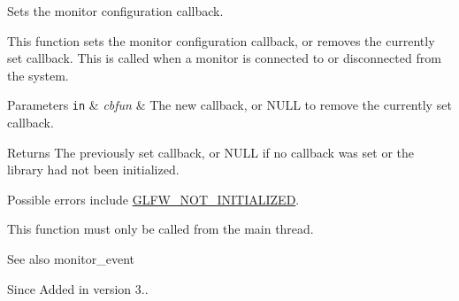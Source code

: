 Sets the monitor configuration callback. 

This function sets the monitor configuration callback, or removes the currently set callback. This is called when a monitor is connected to or disconnected from the system.


\begin{DoxyParams}[1]{Parameters}
\mbox{\tt in}  & {\em cbfun} & The new callback, or {\ttfamily N\+U\+LL} to remove the currently set callback. \\
\hline
\end{DoxyParams}
\begin{DoxyReturn}{Returns}
The previously set callback, or {\ttfamily N\+U\+LL} if no callback was set or the library had not been initialized.
\end{DoxyReturn}
Possible errors include \hyperlink{group__errors_ga2374ee02c177f12e1fa76ff3ed15e14a}{G\+L\+F\+W\+\_\+\+N\+O\+T\+\_\+\+I\+N\+I\+T\+I\+A\+L\+I\+Z\+ED}.

This function must only be called from the main thread.

\begin{DoxySeeAlso}{See also}
monitor\+\_\+event
\end{DoxySeeAlso}
\begin{DoxySince}{Since}
Added in version 3.. 
\end{DoxySince}
